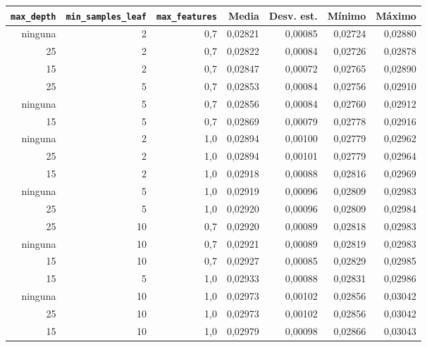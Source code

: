\begin{tabular}{rrrrrrr}
\toprule
\texttt{max\_depth} & \texttt{min\_samples\_leaf} & \texttt{max\_features} & Media & Desv. est. & Mínimo & Máximo \\
\midrule
ninguna & 2 & 0{,}7 & 0{,}02821 & 0{,}00085 & 0{,}02724 & 0{,}02880 \\
25 & 2 & 0{,}7 & 0{,}02822 & 0{,}00084 & 0{,}02726 & 0{,}02878 \\
15 & 2 & 0{,}7 & 0{,}02847 & 0{,}00072 & 0{,}02765 & 0{,}02890 \\
25 & 5 & 0{,}7 & 0{,}02853 & 0{,}00084 & 0{,}02756 & 0{,}02910 \\
ninguna & 5 & 0{,}7 & 0{,}02856 & 0{,}00084 & 0{,}02760 & 0{,}02912 \\
15 & 5 & 0{,}7 & 0{,}02869 & 0{,}00079 & 0{,}02778 & 0{,}02916 \\
ninguna & 2 & 1{,}0 & 0{,}02894 & 0{,}00100 & 0{,}02779 & 0{,}02962 \\
25 & 2 & 1{,}0 & 0{,}02894 & 0{,}00101 & 0{,}02779 & 0{,}02964 \\
15 & 2 & 1{,}0 & 0{,}02918 & 0{,}00088 & 0{,}02816 & 0{,}02969 \\
ninguna & 5 & 1{,}0 & 0{,}02919 & 0{,}00096 & 0{,}02809 & 0{,}02983 \\
25 & 5 & 1{,}0 & 0{,}02920 & 0{,}00096 & 0{,}02809 & 0{,}02984 \\
25 & 10 & 0{,}7 & 0{,}02920 & 0{,}00089 & 0{,}02818 & 0{,}02983 \\
ninguna & 10 & 0{,}7 & 0{,}02921 & 0{,}00089 & 0{,}02819 & 0{,}02983 \\
15 & 10 & 0{,}7 & 0{,}02927 & 0{,}00085 & 0{,}02829 & 0{,}02985 \\
15 & 5 & 1{,}0 & 0{,}02933 & 0{,}00088 & 0{,}02831 & 0{,}02986 \\
ninguna & 10 & 1{,}0 & 0{,}02973 & 0{,}00102 & 0{,}02856 & 0{,}03042 \\
25 & 10 & 1{,}0 & 0{,}02973 & 0{,}00102 & 0{,}02856 & 0{,}03042 \\
15 & 10 & 1{,}0 & 0{,}02979 & 0{,}00098 & 0{,}02866 & 0{,}03043 \\
\bottomrule
\end{tabular}